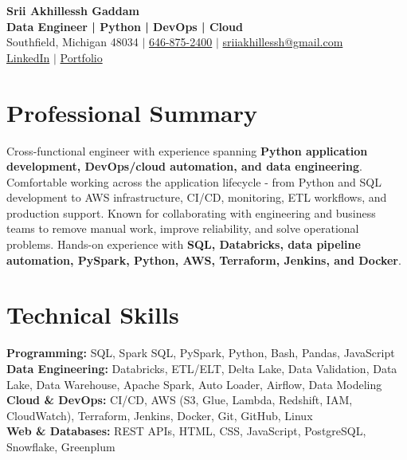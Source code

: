 \documentclass[letterpaper,10pt]{article}
\begin{document}
\fontsize{9.35pt}{10.45pt}\selectfont

\begin{center}
    {\LARGE \textbf{Srii Akhillessh Gaddam}} \\[-1pt]
    \textbf{Data Engineer | Python | DevOps | Cloud} \\[2pt]
    Southfield, Michigan 48034 $|$
    \href{tel:6468752400}{646-875-2400} $|$
    \href{mailto:sriiakhillessh@gmail.com}{sriiakhillessh@gmail.com} \\[1pt]
    \href{https://www.linkedin.com/in/srii-akhiilessh-gaddam-b48668191/}{LinkedIn} $|$
    \href{https://sriiakhillesshg.github.io/portfolio/}{Portfolio}
\end{center}
\vspace{-8pt}

\section{Professional Summary}
\small{Cross-functional engineer with experience spanning \textbf{Python application development, DevOps/cloud automation, and data engineering}. Comfortable working across the application lifecycle - from Python and SQL development to AWS infrastructure, CI/CD, monitoring, ETL workflows, and production support. Known for collaborating with engineering and business teams to remove manual work, improve reliability, and solve operational problems. Hands-on experience with \textbf{SQL, Databricks, data pipeline automation, PySpark, Python, AWS, Terraform, Jenkins, and Docker}.}

\section{Technical Skills}
\small{
\textbf{Programming:} SQL, Spark SQL, PySpark, Python, Bash, Pandas, JavaScript \\
\textbf{Data Engineering:} Databricks, ETL/ELT, Delta Lake, Data Validation, Data Lake, Data Warehouse, Apache Spark, Auto Loader, Airflow, Data Modeling \\
\textbf{Cloud \& DevOps:} CI/CD, AWS (S3, Glue, Lambda, Redshift, IAM, CloudWatch), Terraform, Jenkins, Docker, Git, GitHub, Linux \\
\textbf{Web \& Databases:} REST APIs, HTML, CSS, JavaScript, PostgreSQL, Snowflake, Greenplum
}
\end{document}
